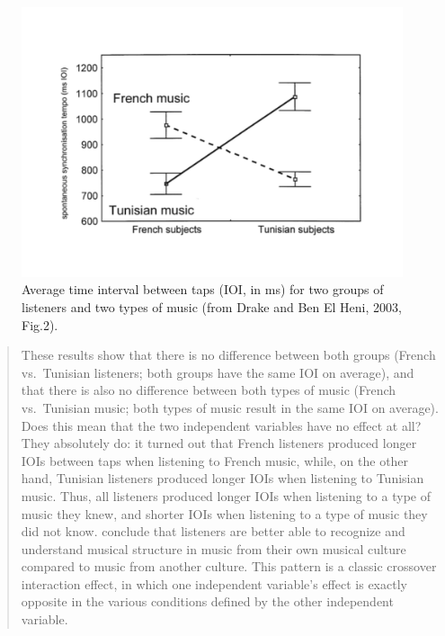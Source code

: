 \documentclass[
]{book}
\begin{document}
\begin{figure}

{\centering \includegraphics{figures/DrakeBenElHeni2003Fig2} 

}

\caption{Average time interval between taps (IOI, in ms) for two groups of listeners and two types of music (from Drake and Ben El Heni, 2003, Fig.2).}\label{fig:drakebenelheni2003fig2}
\end{figure}

\begin{quote}
These results show that there is no difference between both groups (French vs.~Tunisian listeners; both groups have the same IOI on average), and that there is also no difference between both types of music (French vs.~Tunisian music; both types of music result in the same IOI on average). Does this mean that the two independent variables have no effect at all? They absolutely do: it turned out that French listeners produced longer IOIs between taps when listening to French music, while, on the other hand, Tunisian listeners produced longer IOIs when listening to Tunisian music. Thus, all listeners produced longer IOIs when listening to a type of music they knew, and shorter IOIs when listening to a type of music they did not know. \citet{Drake03} conclude that listeners are better able to recognize and understand musical structure in music from their own musical culture compared to music from another culture. This pattern is a classic crossover interaction effect, in which one independent variable's effect is exactly opposite in the various conditions defined by the other independent variable.
\end{quote}
\end{document}
